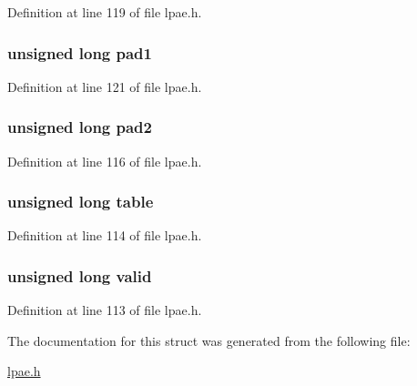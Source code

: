 \-Definition at line 119 of file lpae.\-h.

\hypertarget{structlpae__walk__t_abd440cbf12babccd9a6b85615adb551d}{
\subsubsection[{pad1}]{\setlength{\rightskip}{0pt plus 5cm}unsigned long {\bf pad1}}}\label{structlpae__walk__t_abd440cbf12babccd9a6b85615adb551d}


\-Definition at line 121 of file lpae.\-h.

\hypertarget{structlpae__walk__t_a3c41899b360fc210cecdadafb8496709}{
\subsubsection[{pad2}]{\setlength{\rightskip}{0pt plus 5cm}unsigned long {\bf pad2}}}\label{structlpae__walk__t_a3c41899b360fc210cecdadafb8496709}


\-Definition at line 116 of file lpae.\-h.

\hypertarget{structlpae__walk__t_afe6d8cf4d4c78126d82831e6d5ef5483}{
\subsubsection[{table}]{\setlength{\rightskip}{0pt plus 5cm}unsigned long {\bf table}}}\label{structlpae__walk__t_afe6d8cf4d4c78126d82831e6d5ef5483}


\-Definition at line 114 of file lpae.\-h.

\hypertarget{structlpae__walk__t_a7bcbc21e402fb9e3dc07789d414ef17c}{
\subsubsection[{valid}]{\setlength{\rightskip}{0pt plus 5cm}unsigned long {\bf valid}}}\label{structlpae__walk__t_a7bcbc21e402fb9e3dc07789d414ef17c}


\-Definition at line 113 of file lpae.\-h.



\-The documentation for this struct was generated from the following file\-:\begin{DoxyCompactItemize}
\item 
\hyperlink{lpae_8h}{lpae.\-h}\end{DoxyCompactItemize}
